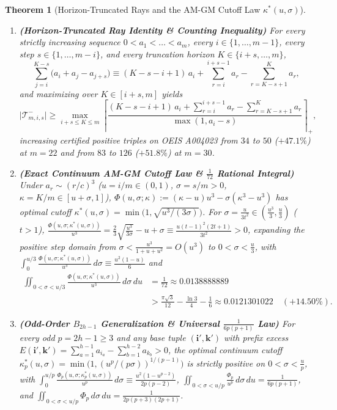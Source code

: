 \documentclass[11pt,a4paper]{article}
\newtheorem{theorem}{Theorem}[section]
\theoremstyle{remark}
\begin{document}
\begin{theorem}[Horizon-Truncated Rays and the AM-GM Cutoff Law $\kappa^*(u, \sigma)$]
\begin{enumerate}
  \item \textbf{(Horizon-Truncated Ray Identity \& Counting Inequality)} For every strictly increasing sequence $0 < a_1 < \dots < a_m$, every $i \in \{1, \dots, m - 1\}$, every step $s \in \{1, \dots, m - i\}$, and every truncation horizon $K \in \{i + s, \dots, m\}$,
  \[
    \sum_{j=i}^{K-s} \bigl(a_i + a_j - a_{j+s}\bigr) \equiv (K - s - i + 1)\,a_i + \sum_{r=i}^{i+s-1} a_r - \sum_{r=K-s+1}^K a_r,
  \]
  and maximizing over $K \in [i + s, m]$ yields
  \[
    \bigl|\mathcal{T}_{m, i, s}^-\bigr| \ge \max_{i+s \le K \le m} \left\lceil \frac{(K - s - i + 1)\,a_i + \sum_{r=i}^{i+s-1} a_r - \sum_{r=K-s+1}^K a_r}{\max(1, a_i - s)} \right\rceil_+,
  \]
  increasing certified positive triples on OEIS A004023 from $34$ to $50$ ($+47.1\%$) at $m = 22$ and from $83$ to $126$ ($+51.8\%$) at $m = 30$.
  \item \textbf{(Exact Continuum AM-GM Cutoff Law \& $\frac{1}{72}$ Rational Integral)} Under $a_r \sim (r/c)^3$ ($u = i/m \in (0, 1)$, $\sigma = s/m > 0$, $\kappa = K/m \in [u+\sigma, 1]$), $\Phi(u, \sigma; \kappa) := (\kappa - u)u^3 - \sigma(\kappa^3 - u^3)$ has optimal cutoff $\kappa^*(u, \sigma) = \min\bigl(1, \sqrt{u^3/(3\sigma)}\bigr)$. For $\sigma = \frac{u}{3 t^2} \in (\frac{u^3}{3}, \frac{u}{3})$ ($t > 1$), $\frac{\Phi(u, \sigma; \kappa^*(u, \sigma))}{u^3} = \frac{2}{3}\sqrt{\frac{u^3}{3\sigma}} - u + \sigma \equiv \frac{u(t-1)^2(2t+1)}{3t^2} > 0$, expanding the positive step domain from $\sigma < \frac{u^3}{1+u+u^2} = O(u^3)$ to $0 < \sigma < \frac{u}{3}$, with $\int_0^{u/3} \frac{\Phi(u, \sigma; \kappa^*(u, \sigma))}{u^3}\,d\sigma \equiv \frac{u^2(1 - u)}{6}$ and
  \begin{align*}
    \iint_{0 < \sigma < u/3} \frac{\Phi(u, \sigma; \kappa^*(u, \sigma))}{u^3}\,d\sigma\,du &= \frac{1}{72} \approx 0.0138888889 \\
    &> \frac{\pi\sqrt{3}}{12} - \frac{\ln 3}{4} - \frac{1}{6} \approx 0.0121301022 \quad (+14.50\%).
  \end{align*}
  \item \textbf{(Odd-Order $B_{2h-1}$ Generalization \& Universal $\frac{1}{6p(p+1)}$ Law)} For every odd $p = 2h - 1 \ge 3$ and any base tuple $(\mathbf{i}', \mathbf{k}')$ with prefix excess $E(\mathbf{i}', \mathbf{k}') = \sum_{a=1}^{h-1} a_{i_a} - \sum_{b=1}^{h-2} a_{k_b} > 0$, the optimal continuum cutoff $\kappa_p^*(u, \sigma) = \min\bigl(1, (u^p/(p\sigma))^{1/(p-1)}\bigr)$ is strictly positive on $0 < \sigma < \frac{u}{p}$, with $\int_0^{u/p} \frac{\Phi_p(u, \sigma; \kappa_p^*(u, \sigma))}{u^p}\,d\sigma \equiv \frac{u^2(1 - u^{p-2})}{2p(p - 2)}$, $\iint_{0 < \sigma < u/p} \frac{\Phi_p}{u^p}\,d\sigma\,du = \frac{1}{6p(p+1)}$, and $\iint_{0 < \sigma < u/p} \Phi_p\,d\sigma\,du = \frac{1}{2p(p+3)(2p+1)}$.
\end{enumerate}
\end{theorem}
\end{document}
